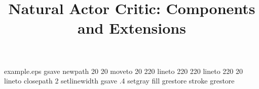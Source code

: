 %
%
%
%
%
\begin{filecontents*}{example.eps}
gsave
newpath
  20 20 moveto
  20 220 lineto
  220 220 lineto
  220 20 lineto
closepath
2 setlinewidth
gsave
  .4 setgray fill
grestore
stroke
grestore
\end{filecontents*}
%
\RequirePackage{fix-cm}
%
\documentclass[smallextended]{svjour3}       %
%
\smartqed  %
%
\usepackage{graphicx}

%
%

\usepackage{natbib} %
\usepackage{amsmath, amssymb}
\usepackage{algorithm}
\usepackage{algorithmic}


\newcommand{\x}{\item}
\newcommand{\parTitle}[1]{\textbf{#1:}}
\DeclareMathOperator{\E}{\mathbb{E}}
\setlength\parindent{0pt}

%
%

\title{Natural Actor Critic: Components and Extensions
}

